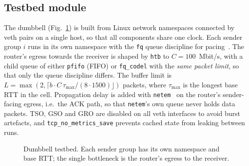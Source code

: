 \documentclass[conference]{IEEEtran}
\begin{document}
\subsection{Testbed module}
The dumbbell (Fig.~\ref{fig:topo}) is built from Linux network namespaces connected by veth pairs on a single host, so that all components share one clock. Each sender group $i$ runs in its own namespace with the \texttt{fq} queue discipline for pacing~\cite{bless2025bbrv3}. The router's egress towards the receiver is shaped by \texttt{htb} to $C=100$~Mbit/s, with a child queue of either \texttt{pfifo} (FIFO) or \texttt{fq\_codel} with the \emph{same packet limit}, so that only the queue discipline differs. The buffer limit is $L=\max(2,\lceil b\cdot C\,\tau_{\max}/(8\cdot1500)\rfloor)$ packets, where $\tau_{\max}$ is the longest base RTT in the cell. Propagation delay is added with \texttt{netem}~\cite{hemminger2005netem} on the router's sender-facing egress, i.e.\ the ACK path, so that \texttt{netem}'s own queue never holds data packets. TSO, GSO and GRO are disabled on all veth interfaces to avoid burst artefacts, and \texttt{tcp\_no\_metrics\_save} prevents cached state from leaking between runs.

\begin{figure}[t]
\centering
{}
\caption{Dumbbell testbed. Each sender group has its own namespace and base RTT; the single bottleneck is the router's egress to the receiver.}
\label{fig:topo}
\end{figure}
\end{document}
